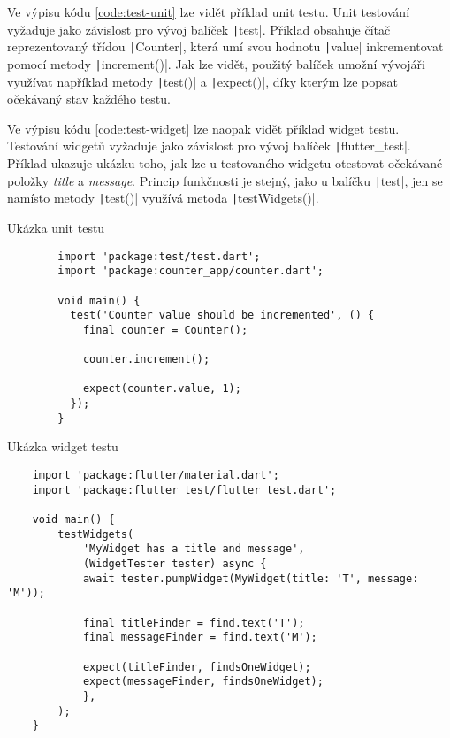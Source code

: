 Ve výpisu kódu \ref{code:test-unit} lze vidět příklad unit testu.
\cite{testing_flutter_unit}
Unit testování vyžaduje jako závislost pro vývoj balíček
\texttt|test|.
Příklad obsahuje čítač reprezentovaný třídou \texttt|Counter|,
která umí svou hodnotu \texttt|value| inkrementovat pomocí
metody \texttt|increment()|.
Jak lze vidět,
použitý balíček umožní vývojáři využívat například metody
\texttt|test()| a \texttt|expect()|,
díky kterým lze popsat očekávaný stav každého testu.

Ve výpisu kódu \ref{code:test-widget} lze naopak vidět příklad widget testu.
\cite{testing_flutter_widget}
Testování widgetů vyžaduje jako závislost pro vývoj balíček
\texttt|flutter_test|.
Příklad ukazuje ukázku toho,
jak lze u testovaného widgetu otestovat očekávané položky \emph{title}
a \emph{message}.
Princip funkčnosti je stejný,
jako u balíčku \texttt|test|,
jen se namísto metody \texttt|test()|
využívá metoda \texttt|testWidgets()|.

\begin{listing}
    \caption{Ukázka unit testu \cite{testing_flutter_unit}}
    \label{code:test-unit}
    \begin{verbatim}
        import 'package:test/test.dart';
        import 'package:counter_app/counter.dart';
        
        void main() {
          test('Counter value should be incremented', () {
            final counter = Counter();
        
            counter.increment();
        
            expect(counter.value, 1);
          });
        }
    \end{verbatim}
\end{listing}

\begin{listing}
    \caption{Ukázka widget testu \cite{testing_flutter_widget}}
    \label{code:test-widget}
    \begin{verbatim}
    import 'package:flutter/material.dart';
    import 'package:flutter_test/flutter_test.dart';

    void main() {
        testWidgets(
            'MyWidget has a title and message',
            (WidgetTester tester) async {
            await tester.pumpWidget(MyWidget(title: 'T', message: 'M'));

            final titleFinder = find.text('T');
            final messageFinder = find.text('M');

            expect(titleFinder, findsOneWidget);
            expect(messageFinder, findsOneWidget);
            },
        );
    }
    \end{verbatim}
\end{listing}


